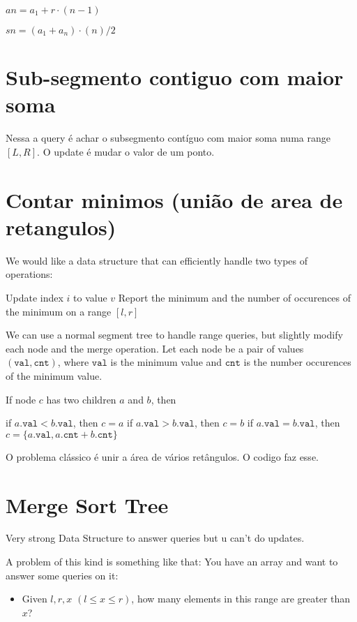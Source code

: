     $an = a_1 + r \cdot (n-1)$
    
    $sn = (a_1 + a_n) \cdot (n) / 2$

    
    \section{Sub-segmento contiguo com maior soma}

    \tab Nessa a query é achar o subsegmento contíguo com maior soma numa range $[L,R]$.
    O update é mudar o valor de um ponto.
    

    \section{Contar minimos (união de area de retangulos)}

    \tab We would like a data structure that can efficiently handle two types of operations:

    Update index $i$ to value $v$
    Report the minimum and the number of occurences of the minimum on a range $[l, r]$
    
    
    We can use a normal segment tree to handle range queries, but slightly modify each node and the merge operation. Let each node be a pair of values $(\texttt{val}, \texttt{cnt})$, where $\texttt{val}$ is the minimum value and $\texttt{cnt}$ is the number occurences of the minimum value.
    
    If node $c$ has two children $a$ and $b$, then
    
    if $a.\texttt{val} < b.\texttt{val}$, then $c = a$
    if $a.\texttt{val} > b.\texttt{val}$, then $c = b$
    if $a.\texttt{val} = b.\texttt{val}$, then $c = \{a.\texttt{val}, a.\texttt{cnt} + b.\texttt{cnt}\}$

    O problema clássico é unir a área de vários retângulos. O codigo faz esse.
    
    

    \section{Merge Sort Tree}

    Very strong Data Structure to answer queries but u can't do updates.

    A problem of this kind is something like that: You have an array and want to answer some queries on it:
    \begin{itemize}
        \item Given $l, r, x$ $(l \le x \le r)$, how many elements in this range are greater than $x$?
    \end{itemize}

